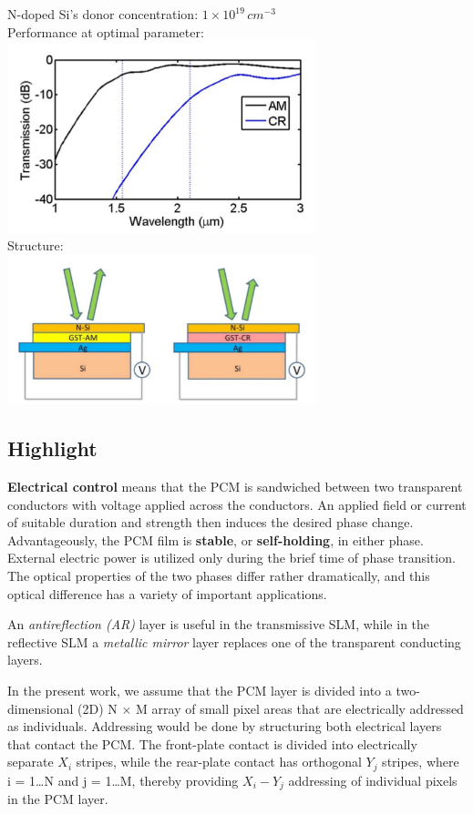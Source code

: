\documentclass[]{article}
\begin{document}
N-doped Si's donor concentration: \(1 \times 10^{19} \,cm^{-3}\)\\
Performance at optimal parameter:\\
\includegraphics[width = 9cm]{image/002_03.png}\\
\newpage
Structure:\\
\includegraphics[width = 9cm]{image/002_04.png}

\subsection{Highlight}\label{highlight}

\textbf{Electrical control} means that the PCM is sandwiched between two
transparent conductors with voltage applied across the conductors. An
applied field or current of suitable duration and strength then induces
the desired phase change. Advantageously, the PCM film is
\textbf{stable}, or \textbf{self-holding}, in either phase. External
electric power is utilized only during the brief time of phase
transition. The optical properties of the two phases differ rather
dramatically, and this optical difference has a variety of important
applications.

An \emph{antireflection (AR)} layer is useful in the transmissive SLM,
while in the reflective SLM a \emph{metallic mirror} layer replaces one
of the transparent conducting layers.

In the present work, we assume that the PCM layer is divided into a
two-dimensional (2D) N × M array of small pixel areas that are
electrically addressed as individuals. Addressing would be done by
structuring both electrical layers that contact the PCM. The front-plate
contact is divided into electrically separate \(X_i\) stripes, while the
rear-plate contact has orthogonal \(Y_j\) stripes, where i = 1\ldots{}N
and j = 1\ldots{}M, thereby providing \(X_i - Y_j\) addressing of
individual pixels in the PCM layer.
\end{document}
